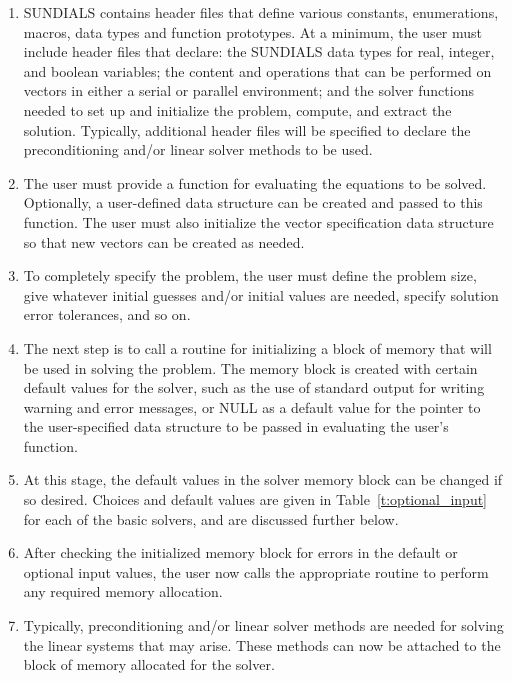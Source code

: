 \begin{enumerate}

\item \label{sun_headers}
SUNDIALS contains header files that define various constants,
enumerations, macros, data types and function prototypes.  At a
minimum, the user must include header files that declare: the SUNDIALS
data types for real, integer, and boolean variables; the content and
operations that can be performed on vectors in either a serial or
parallel environment; and the solver functions needed to
set up and initialize the problem, compute, and extract the solution. 
Typically, additional header files will be specified to declare the 
preconditioning and/or linear solver methods to be used.

\item \label{sun_problem}
The user must provide a function for evaluating the equations to be
solved. Optionally, a user-defined data structure can be created and
passed to this function. The user must also initialize the vector
specification data structure so that new vectors can be created as needed.

\item \label{sun_size}
To completely specify the problem, the user must define the problem
size, give whatever initial guesses and/or initial values are
needed, specify solution error tolerances, and so on. 

\item \label{sun_create}
The next step is to call a routine for initializing a block of memory
that will be used in solving the problem. The memory block is created
with certain default values for the solver, such as the use of
standard output for writing warning and error messages, or NULL
as a default value for the pointer to the user-specified data
structure to be passed in evaluating the user's function.

\item \label{sun_set}
At this stage, the default values in the solver memory block can be
changed if so desired. Choices and default values are given in
Table~\ref{t:optional_input} for each of the basic solvers, and
are discussed further below.

\item \label{sun_malloc}
After checking the initialized memory block for
errors in the default or optional input values, the user now calls 
the appropriate routine to perform any required
memory allocation.

\item \label{sun_linear}
Typically, preconditioning and/or linear solver methods are needed for
solving the linear systems that may arise. These methods can now be
attached to the block of memory allocated for the solver.


\end{enumerate}
